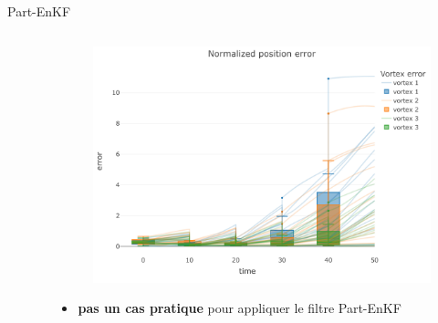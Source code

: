 \documentclass[aspectratio=169]{beamer} %
\begin{document}
\begin{frame}{Part-EnKF}
    \begin{columns}[t]
        \begin{column}{0.5\textwidth}
            \vspace{-0.5cm}
            \begin{figure}
                \centering
            \end{figure}
        \end{column}
        \begin{column}{0.5\textwidth}
            \begin{figure}
                \centering
                \includegraphics[width=\textwidth]{../../conference/images/part_enkf_error.pdf}
            \end{figure}

            \begin{itemize}
                \item \textbf{pas un cas pratique} pour appliquer le filtre Part-EnKF
            \end{itemize}
        \end{column}
    \end{columns}
\end{frame}
\end{document}

